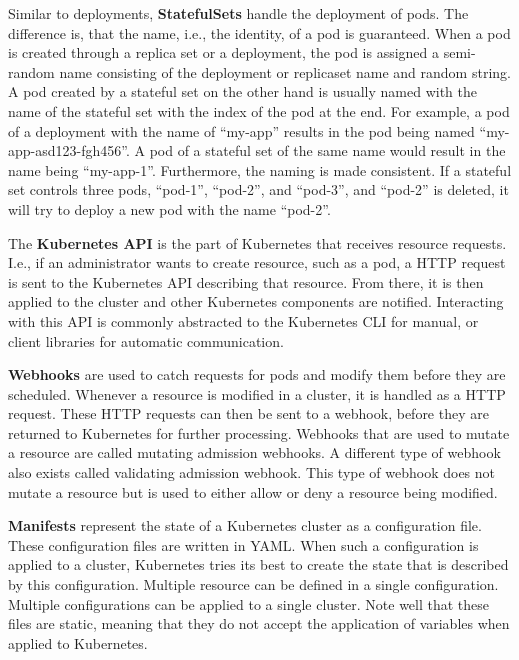 Similar to deployments, \textbf{StatefulSets}\cite{kubernetes-statefulsets} handle the deployment of pods.
The difference is, that the name, i.e., the identity, of a pod is guaranteed.
When a pod is created through a replica set or a deployment, the pod is assigned a semi-random name consisting of the deployment or replicaset name and random string.
A pod created by a stateful set on the other hand is usually named with the name of the stateful set with the index of the pod at the end.
For example, a pod of a deployment with the name of ``my-app'' results in the pod being named ``my-app-asd123-fgh456''.
A pod of a stateful set of the same name would result in the name being ``my-app-1''.
Furthermore, the naming is made consistent.
If a stateful set controls three pods, ``pod-1'', ``pod-2'', and ``pod-3'', and ``pod-2'' is deleted, it will try to deploy a new pod with the name ``pod-2''.

The \textbf{Kubernetes API}\cite{kubernetes-api} is the part of Kubernetes that receives resource requests.
I.e., if an administrator wants to create resource, such as a pod, a HTTP request is sent to the Kubernetes API describing that resource.
From there, it is then applied to the cluster and other Kubernetes components are notified.
Interacting with this API is commonly abstracted to the Kubernetes CLI for manual, or client libraries for automatic communication.

\pagebreak

\textbf{Webhooks}\cite{kubernetes-webhooks} are used to catch requests for pods and modify them before they are scheduled.
Whenever a resource is modified in a cluster, it is handled as a HTTP request.
These HTTP requests can then be sent to a webhook, before they are returned to Kubernetes for further processing.
Webhooks that are used to mutate a resource are called mutating admission webhooks.
A different type of webhook also exists called validating admission webhook.
This type of webhook does not mutate a resource but is used to either allow or deny a resource being modified.

\textbf{Manifests}\cite{kubernetes-manifests} represent the state of a Kubernetes cluster as a configuration file.
These configuration files are written in YAML.
When such a configuration is applied to a cluster, Kubernetes tries its best to create the state that is described by this configuration.
Multiple resource can be defined in a single configuration.
Multiple configurations can be applied to a single cluster.
Note well that these files are static, meaning that they do not accept the application of variables when applied to Kubernetes.

